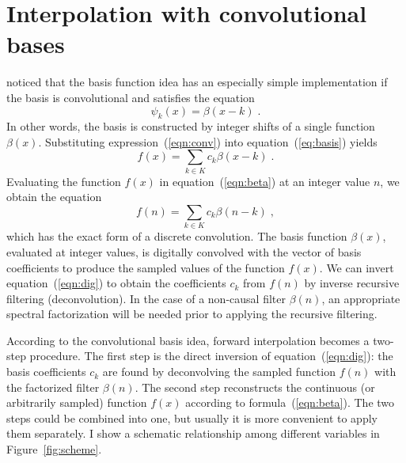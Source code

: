 \section{Interpolation with convolutional bases}

\cite{unser1} noticed that the basis function idea has an
especially simple implementation if the basis is convolutional and
satisfies the equation
\begin{equation}
  \label{eqn:conv}
  \psi_k (x) = \beta (x-k)\;.
\end{equation}
In other words, the basis is constructed by integer shifts of a single
function $\beta(x)$. Substituting expression~(\ref{eqn:conv}) into
equation~(\ref{eq:basis}) yields
\begin{equation}\label{eqn:beta}
  f (x) = \sum_{k \in K} c_k \beta (x - k)\;.
\end{equation}
Evaluating the function $f(x)$ in equation~(\ref{eqn:beta}) at an
integer value $n$, we obtain the equation
\begin{equation}\label{eqn:dig}
  f (n) = \sum_{k \in K} c_k \beta (n-k)\;,
\end{equation}
which has the exact form of a discrete convolution. The basis function
$\beta(x)$, evaluated at integer values, is digitally convolved with
the vector of basis coefficients to produce the sampled values of the
function $f(x)$. We can invert equation~(\ref{eqn:dig}) to obtain the
coefficients $c_k$ from $f(n)$ by inverse recursive filtering
(deconvolution). In the case of a non-causal filter $\beta(n)$, an 
appropriate spectral factorization will be
needed prior to applying the recursive filtering.
\par


According to the convolutional basis idea, forward interpolation
becomes a two-step procedure. The first step is the direct inversion
of equation~(\ref{eqn:dig}): the basis coefficients $c_k$ are found by
deconvolving the sampled function $f(n)$ with the factorized filter
$\beta(n)$. The second step reconstructs the continuous (or arbitrarily
sampled) function $f(x)$ according to formula~(\ref{eqn:beta}). The
two steps could be combined into one, but usually it is more
convenient to apply them separately. I show a schematic relationship
among different variables in Figure~\ref{fig:scheme}.


